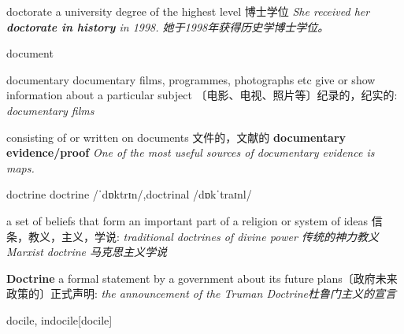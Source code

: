 \begin{DefWord}{doctorate}
    a university degree of the highest level 博士学位
    \textit{She received her \textbf{doctorate in history} in 1998. 她于1998年获得历史学博士学位。 }
\end{DefWord}


\begin{DefWord}{document}
\end{DefWord}

\begin{DefWord}{documentary}
    documentary films, programmes, photographs etc give or show information about a particular subject
    〔电影、电视、照片等〕纪录的，纪实的:
    \textit{documentary films}

    consisting of or written on documents
    文件的，文献的
    \textbf{documentary evidence/proof}
    \textit{One of the most useful sources of documentary evidence is maps.}
\end{DefWord}

\begin{DefWord}{doctrine}
    doctrine /ˈdɒktrɪn/,doctrinal /dɒkˈtraɪnl/

    a set of beliefs that form an important part of a religion or system of ideas
    信条，教义，主义，学说:
    \textit{traditional doctrines of divine power 传统的神力教义}
    \textit{Marxist doctrine 马克思主义学说}

    \textbf{Doctrine}  a formal statement by a government about its future plans〔政府未来政策的〕正式声明:
    \textit{the announcement of the Truman Doctrine杜鲁门主义的宣言}
\end{DefWord}

\begin{DefWord}{docile, indocile}[docile]
\end{DefWord}